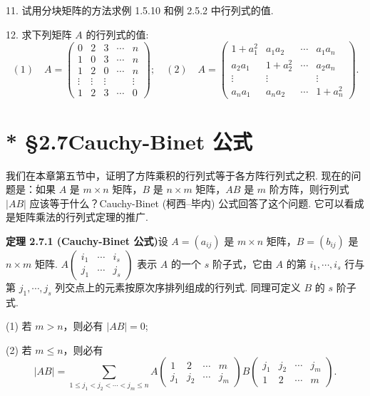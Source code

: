 \documentclass[UTF8,12pt,a4paper,fontset=fandol]{ctexart}
\begin{document}
11. 试用分块矩阵的方法求例 1.5.10 和例 2.5.2 中行列式的值.

12. 求下列矩阵 $A$ 的行列式的值:
\[
(1)\quad A=\left(\begin{array}{ccccc}
0 & 2 & 3 & \cdots & n\\
1 & 0 & 3 & \cdots & n\\
1 & 2 & 0 & \cdots & n\\
\vdots & \vdots & \vdots & & \vdots\\
1 & 2 & 3 & \cdots & 0
\end{array}\right);
\quad
(2)\quad A=\left(\begin{array}{cccc}
1+a_1^2 & a_1a_2 & \cdots & a_1a_n\\
a_2a_1 & 1+a_2^2 & \cdots & a_2a_n\\
\vdots & \vdots & & \vdots\\
a_na_1 & a_na_2 & \cdots & 1+a_n^2
\end{array}\right).
\]

\section*{* §2.7\quad Cauchy-Binet 公式}

我们在本章第五节中，证明了方阵乘积的行列式等于各方阵行列式之积. 现在的问题是：如果 $A$ 是 $m\times n$ 矩阵，$B$ 是 $n\times m$ 矩阵，$AB$ 是 $m$ 阶方阵，则行列式 $|AB|$ 应该等于什么？Cauchy-Binet (柯西--毕内) 公式回答了这个问题. 它可以看成是矩阵乘法的行列式定理的推广.

\noindent\textbf{定理 2.7.1 (Cauchy-Binet 公式)}\quad 设 $A=(a_{ij})$ 是 $m\times n$ 矩阵，$B=(b_{ij})$ 是 $n\times m$ 矩阵. $A\left(\begin{array}{ccc}i_1&\cdots&i_s\\ j_1&\cdots&j_s\end{array}\right)$ 表示 $A$ 的一个 $s$ 阶子式，它由 $A$ 的第 $i_1,\cdots,i_s$ 行与第 $j_1,\cdots,j_s$ 列交点上的元素按原次序排列组成的行列式. 同理可定义 $B$ 的 $s$ 阶子式.

(1) 若 $m>n$，则必有 $|AB|=0$;

(2) 若 $m\leq n$，则必有
\[
|AB|=\sum_{1\leq j_1<j_2<\cdots<j_m\leq n}
A\left(\begin{array}{cccc}
1 & 2 & \cdots & m\\
j_1 & j_2 & \cdots & j_m
\end{array}\right)
B\left(\begin{array}{cccc}
j_1 & j_2 & \cdots & j_m\\
1 & 2 & \cdots & m
\end{array}\right).
\]
\end{document}
